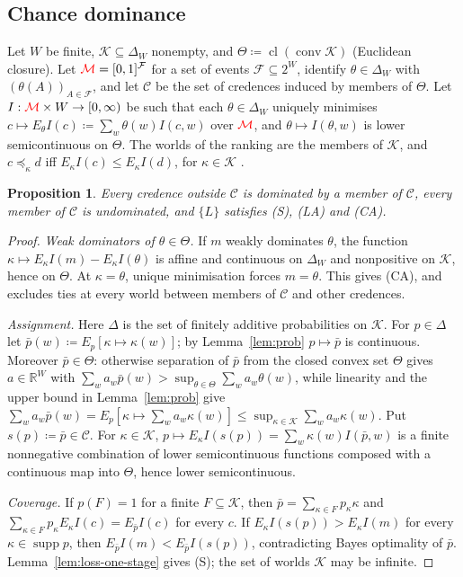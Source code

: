 \documentclass[11pt]{article}
\newcommand{\chg}[1]{{\color{red}#1}}
\newtheorem{proposition}[theorem]{Proposition}
\theoremstyle{definition}
\theoremstyle{remark}
\newcommand{\M}{\mathcal M}
\newcommand{\C}{\mathcal C}
\newcommand{\supp}{\operatorname{supp}}
\newcommand{\cl}{\operatorname{cl}}
\begin{document}
\subsection{Chance dominance}

Let $W$ be finite, $\mathcal K\subseteq\Delta_W$ nonempty, and $\Theta\coloneqq\cl(\operatorname{conv}\mathcal K)$ (Euclidean closure). Let $\chg{\M}=[0,1]^{\mathcal F}$ for a set of events $\mathcal F\subseteq2^W$, identify $\theta\in\Delta_W$ with $(\theta(A))_{A\in\mathcal F}$, and let $\C$ be the set of credences induced by members of $\Theta$. Let $I:\chg{\M}\times W\to[0,\infty)$ be such that each $\theta\in\Delta_W$ uniquely minimises $c\mapsto E_\theta I(c)\coloneqq\sum_w\theta(w)I(c,w)$ over $\chg{\M}$, and $\theta\mapsto I(\theta,w)$ is lower semicontinuous on $\Theta$. The worlds of the ranking are the members of $\mathcal K$, and $c\preceq_\kappa d$ iff $E_\kappa I(c)\le E_\kappa I(d)$, for $\kappa\in\mathcal K$ \cite[Chapter~10]{Pettigrew2016}.

\begin{proposition}\label{prop:chance}
Every credence outside $\C$ is dominated by a member of $\C$, every member of $\C$ is undominated, and $\{L\}$ satisfies \chg{(S), (LA) and (CA)}.
\end{proposition}
\begin{proof}
\emph{Weak dominators of $\theta\in\Theta$.} If $m$ weakly dominates $\theta$, the function $\kappa\mapsto E_\kappa I(m)-E_\kappa I(\theta)$ is affine and continuous on $\Delta_W$ and nonpositive on $\mathcal K$, hence on $\Theta$. At $\kappa=\theta$, unique minimisation forces $m=\theta$. This gives \chg{(CA)}, and excludes ties at every world between members of $\C$ and other credences.

\emph{Assignment.} Here $\Delta$ is the set of finitely additive probabilities on $\mathcal K$. For $p\in\Delta$ let $\bar p(w)\coloneqq E_p[\kappa\mapsto\kappa(w)]$; by Lemma~\ref{lem:prob} $p\mapsto\bar p$ is continuous. Moreover $\bar p\in\Theta$: otherwise separation of $\bar p$ from the closed convex set $\Theta$ gives $a\in\mathbb R^W$ with $\sum_wa_w\bar p(w)>\sup_{\theta\in\Theta}\sum_wa_w\theta(w)$, while linearity and the upper bound in Lemma~\ref{lem:prob} give $\sum_wa_w\bar p(w)=E_p[\kappa\mapsto\sum_wa_w\kappa(w)]\le\sup_{\kappa\in\mathcal K}\sum_wa_w\kappa(w)$. Put $s(p)\coloneqq\bar p\in\C$. For $\kappa\in\mathcal K$, $p\mapsto E_\kappa I(s(p))=\sum_w\kappa(w)I(\bar p,w)$ is a finite nonnegative combination of lower semicontinuous functions composed with a continuous map into $\Theta$, hence lower semicontinuous.

\emph{Coverage.} If $p(F)=1$ for a finite $F\subseteq\mathcal K$, then $\bar p=\sum_{\kappa\in F}p_\kappa\kappa$ and $\sum_{\kappa\in F}p_\kappa E_\kappa I(c)=E_{\bar p}I(c)$ for every $c$. If $E_\kappa I(s(p))>E_\kappa I(m)$ for every $\kappa\in\supp p$, then $E_{\bar p}I(m)<E_{\bar p}I(s(p))$, contradicting Bayes optimality of $\bar p$. Lemma~\ref{lem:loss-one-stage} gives \chg{(S)}; the set of worlds $\mathcal K$ may be infinite.
\end{proof}
\end{document}
